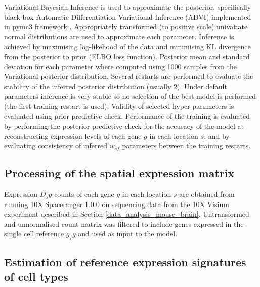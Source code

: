 \documentclass[11pt,a4paper]{article}
\begin{document}
Variational Bayesian Inference is used to approximate the posterior, specifically black-box Automatic Differentiation Variational Inference (ADVI) implemented in pymc3 framework \cite{salvatier_probabilistic_2016}. Appropriately transformed (to positive scale) univatiate normal distributions are used to approximate each parameter. Inference is achieved by maximising log-likehood of the data and minimising KL divergence from the posterior to prior (ELBO loss function). Posterior mean and standard deviation for each parameter where computed using 1000 samples from the Variational posterior distribution.
Several restarts are performed to evaluate the stability of the inferred posterior distribution (usually 2). Under default parameters inference is very stable so no selection of the best model is performed (the first training restart is used). Validity of selected hyper-parameters is evaluated using prior predictive check. Performance of the training is evaluated by performing the posterior predictive check for the accuracy of the model at reconstructing expression levels of each gene $g$ in each location $s$; and by evaluating consistency of inferred $w_{sf}$ parameters between the training restarts.

\subsection{Processing of the spatial expression matrix} \label{c2l_sp_proc}
Expression $D_sg$ counts of each gene $g$ in each location $s$ are obtained from running 10X Spaceranger 1.0.0 on sequencing data from the 10X Visium experiment described in Section \ref{data_analysis_mouse_brain}. Untransformed and unnormalised count matrix was filtered to include genes expressed in the single cell reference $g_fg$ and used as input to the model.

\subsection{Estimation of reference expression signatures of cell types} \label{c2l_ref_prog}
\end{document}
